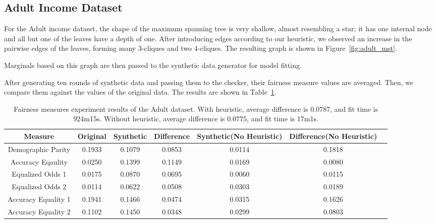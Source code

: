 \documentclass[manuscript,screen,review,anonymous]{acmart}
\begin{document}
\subsection{Adult Income Dataset}

For the Adult income dataset, the shape of the maximum spanning tree is very shallow, almost resembling a star; it has one internal node and all but one of the leaves have a depth of one. After introducing edges according to our heuristic, we observed an increase in the pairwise edges of the leaves, forming many 3-cliques and two 4-cliques. The resulting graph is shown in Figure~\ref{fig:adult_mst}.

Marginals based on this graph are then passed to the synthetic data generator for model fitting.

After generating ten rounds of synthetic data and passing them to the checker, their fairness measure values are averaged. Then, we compare them against the values of the original data. The results are shown in Table~\ref{tab:adult_score}.


\begin{table}[h]
\caption{
    Fairness measures experiment results of the Adult dataset.
    With heuristic, average difference is $0.0787$, and fit time is 924m15s.
    Without heuristic, average difference is $0.0775$, and fit time is 17m1s.
}
\label{tab:adult_score}
\begin{tabular}{ccccccc}
\toprule
\textbf{Measure} & \textbf{Original} & \textbf{Synthetic} & \textbf{Difference} & \textbf{Synthetic(No Heuristic)} & \textbf{Difference(No Heuristic)} \\
\midrule
Demographic Parity  & 0.1933 & 0.1079 & 0.0853 & 0.0114 & 0.1818 \\
Accuracy Eqaulity   & 0.0250 & 0.1399 & 0.1149 & 0.0169 & 0.0080 \\
Equalized Odds 1    & 0.0175 & 0.0870 & 0.0695 & 0.0060 & 0.0115 \\
Equalized Odds 2    & 0.0114 & 0.0622 & 0.0508 & 0.0303 & 0.0189 \\
Accuracy Equality 1 & 0.1941 & 0.1466 & 0.0474 & 0.0315 & 0.1626 \\
Accuracy Equality 2 & 0.1102 & 0.1450 & 0.0348 & 0.0299 & 0.0803 \\
\bottomrule
\end{tabular}
\end{table}
\end{document}
